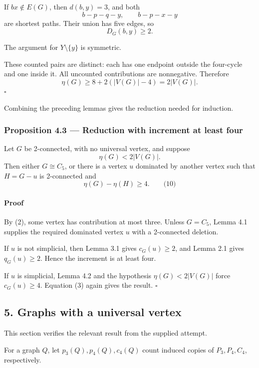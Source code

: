 \documentclass[
  11pt,
  a4paper,
]{article}
\begin{document}
If \(bx\notin E(G)\), then \(d(b,y)=3\), and both \[
b-p-q-y,\qquad b-p-x-y
\] are shortest paths. Their union has five edges, so \[
D_G(b,y)\ge2.
\]

The argument for \(Y\setminus\{y\}\) is symmetric.

These counted pairs are distinct: each has one endpoint outside the
four-cycle and one inside it. All uncounted contributions are
nonnegative. Therefore \[
\eta(G)\ge8+2(|V(G)|-4)=2|V(G)|.
\] \(\square\)

Combining the preceding lemmas gives the reduction needed for induction.

\subsubsection{Proposition 4.3 --- Reduction with increment at least
four}\label{proposition-4.3-reduction-with-increment-at-least-four}

Let \(G\) be 2-connected, with no universal vertex, and suppose \[
\eta(G)<2|V(G)|.
\] Then either \(G\cong C_5\), or there is a vertex \(u\) dominated by
another vertex such that \(H=G-u\) is 2-connected and \[
\boxed{\eta(G)-\eta(H)\ge4.}
\qquad\text{(10)}
\]

\paragraph{Proof}\label{proof-4}

By (2), some vertex has contribution at most three. Unless \(G=C_5\),
Lemma 4.1 supplies the required dominated vertex \(u\) with a
2-connected deletion.

If \(u\) is not simplicial, then Lemma 3.1 gives \(c_G(u)\ge2\), and
Lemma 2.1 gives \(q_G(u)\ge2\). Hence the increment is at least four.

If \(u\) is simplicial, Lemma 4.2 and the hypothesis \(\eta(G)<2|V(G)|\)
force \(c_G(u)\ge4\). Equation (3) again gives the result. \(\square\)

\subsection{5. Graphs with a universal
vertex}\label{graphs-with-a-universal-vertex}

This section verifies the relevant result from the supplied attempt.

For a graph \(Q\), let \(p_3(Q),p_4(Q),c_4(Q)\) count induced copies of
\(P_3,P_4,C_4\), respectively.
\end{document}
